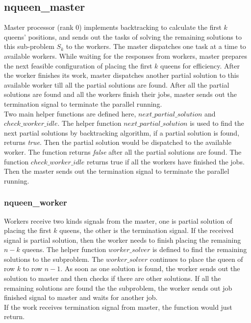 \documentclass[twoside,12pt]{article}
\begin{document}
\subsection{nqueen\_master}
Master processor (rank 0) implements backtracking to calculate the first $ k $ queens' positions, and sends out the tasks of solving the remaining solutions to this sub-problem $ S_k $ to the workers. The master dispatches one task at a time to available workers. While waiting for the responses from workers, master prepares the next feasible configuration of placing the first $ k $ queens for efficiency. After the worker finishes its work, master dispatches another partial solution to this available worker till all the partial solutions are found. After all the partial solutions are found and all the workers finish their jobs, master sends out the termination signal to terminate the parallel running.\\
Two main helper functions are defined here, $ next\_partial\_solution $ and $ check\_worker\_idle $. The helper function $ next\_partial\_solution $ is used to find the next partial solutions by backtracking algorithm, if a partial solution is found, returns \textit{true}. Then the partial solution would be dispatched to the available worker. The function returns \textit{false} after all the partial solutions are found. The function $ check\_worker\_idle $ returns true if all the workers have finished the jobs. Then the master sends out the termination signal to terminate the parallel running.

\subsubsection{nqueen\_worker}
Workers receive two kinds signals from the master, one is partial solution of placing the first $ k $ queens, the other is the termination signal. If the received signal is partial solution, then the worker needs to finish placing the remaining $ n-k $ queens. The helper function $ worker\_solver $ is defined to find the remaining solutions to the subproblem. The $ worker\_solver $ continues to place the queen of row $ k $ to row $ n-1 $. As soon as one solution is found, the worker sends out the solution to master and then checks if there are other solutions. If all the remaining solutions are found the the subproblem, the worker sends out job finished signal to master and waits for another job. \\
If the work receives termination signal from master, the function would just return.
\end{document}
